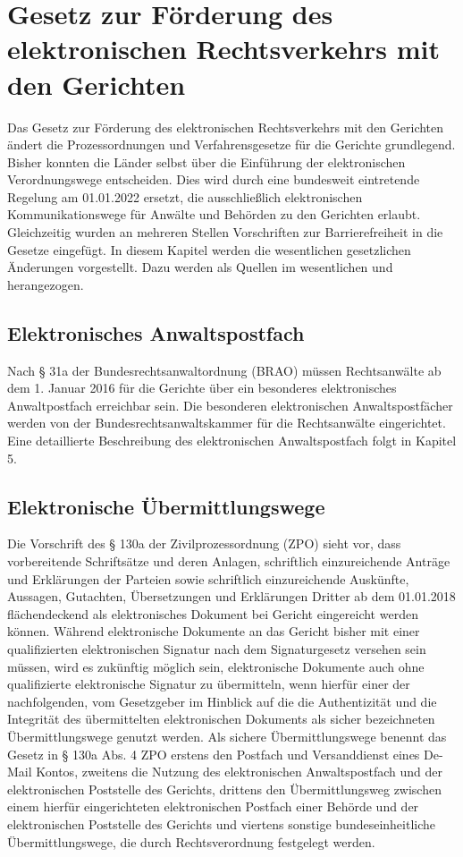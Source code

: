 \section{Gesetz zur Förderung des elektronischen Rechtsverkehrs mit den Gerichten}
Das Gesetz zur Förderung des elektronischen Rechtsverkehrs mit den Gerichten ändert die Prozessordnungen und Verfahrensgesetze für die Gerichte grundlegend. Bisher konnten die Länder selbst über die Einführung der elektronischen Verordnungswege entscheiden. Dies wird durch eine bundesweit eintretende Regelung am 01.01.2022 ersetzt, die ausschließlich elektronischen Kommunikationswege für Anwälte und Behörden zu den Gerichten erlaubt. Gleichzeitig wurden an mehreren Stellen Vorschriften zur Barrierefreiheit in die Gesetze eingefügt. In diesem Kapitel werden die wesentlichen gesetzlichen Änderungen vorgestellt. Dazu werden als Quellen im wesentlichen \textcite{Gesetzfoerderungrechtsverkehr} und \textcite{carstens2015grundlagen} herangezogen.
\subsection*{Elektronisches Anwaltspostfach}
Nach § 31a der Bundesrechtsanwaltordnung (BRAO) müssen Rechtsanwälte ab dem 1. Januar 2016 für die Gerichte über ein besonderes elektronisches Anwaltpostfach erreichbar sein. Die besonderen elektronischen Anwaltspostfächer werden von der Bundesrechtsanwaltskammer für die Rechtsanwälte eingerichtet. Eine detaillierte Beschreibung des elektronischen Anwaltspostfach folgt in Kapitel 5.
\subsection*{Elektronische Übermittlungswege}
Die Vorschrift des § 130a der Zivilprozessordnung (ZPO) sieht vor, dass vorbereitende Schriftsätze und deren Anlagen, schriftlich einzureichende Anträge und Erklärungen der Parteien sowie schriftlich einzureichende Auskünfte, Aussagen, Gutachten, Übersetzungen und Erklärungen Dritter ab dem 01.01.2018 flächendeckend als elektronisches Dokument bei Gericht eingereicht werden können. Während elektronische Dokumente an das Gericht bisher mit einer qualifizierten elektronischen Signatur nach dem Signaturgesetz versehen sein müssen, wird es zukünftig möglich sein, elektronische Dokumente auch ohne qualifizierte elektronische Signatur zu übermitteln, wenn hierfür einer der nachfolgenden, vom Gesetzgeber im Hinblick auf die die Authentizität und die Integrität des übermittelten elektronischen Dokuments als sicher bezeichneten Übermittlungswege genutzt werden. Als sichere Übermittlungswege benennt das Gesetz in § 130a Abs. 4 ZPO erstens den Postfach und Versanddienst eines De-Mail Kontos, zweitens die Nutzung des elektronischen Anwaltspostfach und der elektronischen Poststelle des Gerichts, drittens den Übermittlungsweg zwischen einem hierfür eingerichteten elektronischen Postfach einer Behörde und der elektronischen Poststelle des Gerichts und viertens sonstige  bundeseinheitliche Übermittlungswege, die durch Rechtsverordnung festgelegt werden.
